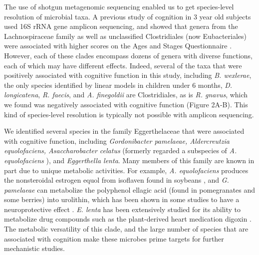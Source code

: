 \documentclass{article}
\begin{document}
The use of shotgun metagenomic sequencing enabled us to get
species-level resolution of microbial taxa. A previous study of
cognition in 3 year old subjects used 16S rRNA gene amplicon sequencing,
and showed that genera from the Lachnospiraceae family as well as
unclassified Clostridiales (now Eubacteriales) were associated with
higher scores on the Ages and Stages Questionnaire
\cite{sordilloAssociationInfantGut2019}.
However, each of these clades encompass dozens of genera with
diverse functions, each of which may have different effects. Indeed,
several of the taxa that were positively associated with cognitive
function in this study, including \emph{B. wexlerae}, the only species
identified by linear models in children under 6 months, \emph{D.
longicatena}, \emph{R. faecis}, and \emph{A. finegoldii} are
Clostridiales, as is \emph{R. gnavus}, which we found was negatively
associated with cognitive function (Figure 2A-B). This kind of
species-level resolution is typically not possible with amplicon
sequencing.

We identified several species in the family Eggerthelaceae that were
associated with cognitive function, including \emph{Gordonibacter
pamelaeae, Aldercreutzia equolofaciens, Asaccharobacter celatus}
(formerly regarded a subspecies of \emph{A. equolofaciens}
\cite{takahashiCompleteGenomeSequence2021}),
and \emph{Eggerthella lenta}. Many members of this family are
known in part due to unique metabolic activities. For example, \emph{A.
equolofaciens} produces the nonsteroidal estrogen equol from isoflaven
found in soybeans \cite{wangEnantioselectiveSynthesisSEquol2005},
and \emph{G. pamelaeae} can metabolize the polyphenol ellagic acid
(found in pomegranates and some berries) into urolithin, which has been
shown in some studies to have a neuroprotective effect
\cite{gongUrolithinAlleviatesBloodbrain2022,selmaDescriptionUrolithinProduction2014}.
\emph{E. lenta} has been extensively studied for
its ability to metabolize drug compounds such as the plant-derived heart
medication digoxin \cite{haiserPredictingManipulatingCardiac2013}.
The metabolic versatility of this clade, and the large number of
species that are associated with cognition make these microbes prime
targets for further mechanistic studies.
\end{document}
